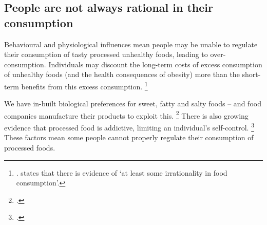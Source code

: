 \documentclass[embargoed]{grattan}
\begin{document}
\subsection{People are not always rational in their consumption}\label{people-are-not-always-rational-in-their-consumption}


Behavioural and physiological influences mean people may be unable to regulate their consumption of tasty processed unhealthy foods, leading to over-consumption.
Individuals may discount the long-term costs of excess consumption of unhealthy foods (and the health consequences of obesity) more than the short-term benefits from this excess consumption.%
\footnote{\textcites{CnossenExcisetaxationAustralia}{Cawley2015economyscalesselective}{Gruber2004Taxincidencewhen}. \textcite{Ruhm2012Understandingovereatingobesity} states that there is evidence of `at least some irrationality in food consumption'.}

We have in-built biological preferences for sweet, fatty and salty foods -- and food companies manufacture their products to exploit this.%
\footcites{Moss2013ExtraordinaryScienceAddictive}{Ruhm2012Understandingovereatingobesity} There is also growing evidence that processed food is addictive, limiting an individual's self-control.%
\footcites{Panel2014POLICYBRIEFoptions}{Gearhardt2009PreliminaryvalidationYale}{Ifland2009Refinedfoodaddiction}{Karnani2016ObesityCrisisas}{Lennerz2013Effectsdietaryglycemic}{Schulte2015Currentconsiderationsregarding} These factors mean some people cannot properly regulate their consumption of processed foods.
\end{document}
